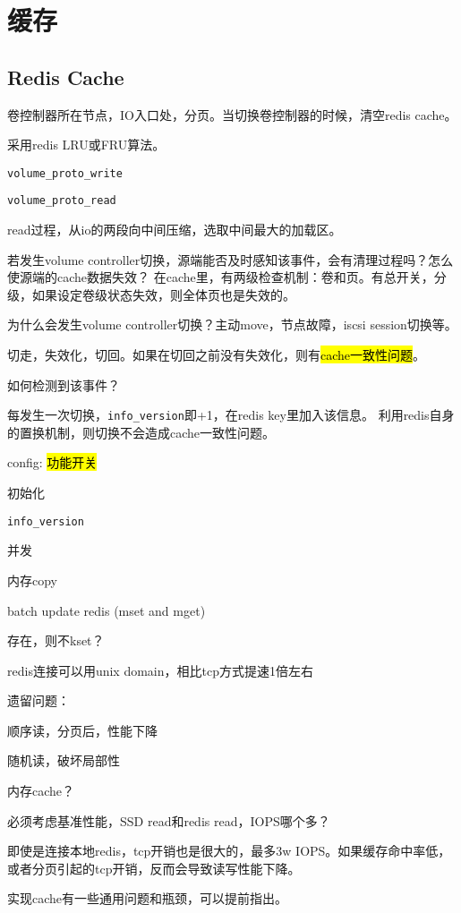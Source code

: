 \chapter{缓存}

\section{Redis Cache}

卷控制器所在节点，IO入口处，分页。当切换卷控制器的时候，清空redis cache。

采用redis LRU或FRU算法。

\begin{compactitem}
    \item \verb|volume_proto_write|
    \item \verb|volume_proto_read|
\end{compactitem}

read过程，从io的两段向中间压缩，选取中间最大的加载区。

若发生volume controller切换，源端能否及时感知该事件，会有清理过程吗？怎么使源端的cache数据失效？
在cache里，有两级检查机制：卷和页。有总开关，分级，如果设定卷级状态失效，则全体页也是失效的。

为什么会发生volume controller切换？主动move，节点故障，iscsi session切换等。

切走，失效化，切回。如果在切回之前没有失效化，则有\hl{cache一致性问题}。

如何检测到该事件？

\begin{tcolorbox}
每发生一次切换，\verb|info_version|即+1，在redis key里加入该信息。
利用redis自身的置换机制，则切换不会造成cache一致性问题。
\end{tcolorbox}

\begin{compactenum}
\item config: \hl{功能开关}
\item 初始化
\item \verb|info_version|
\item 并发
\item 内存copy
\item batch update redis (mset and mget)
\item 存在，则不kset？
\item redis连接可以用unix domain，相比tcp方式提速1倍左右
\end{compactenum}

遗留问题：
\begin{enumbox}
\item 顺序读，分页后，性能下降
\item 随机读，破坏局部性
\item 内存cache？
\item 必须考虑基准性能，SSD read和redis read，IOPS哪个多？
\end{enumbox}

即使是连接本地redis，tcp开销也是很大的，最多3w IOPS。如果缓存命中率低，或者分页引起的tcp开销，反而会导致读写性能下降。

实现cache有一些通用问题和瓶颈，可以提前指出。
